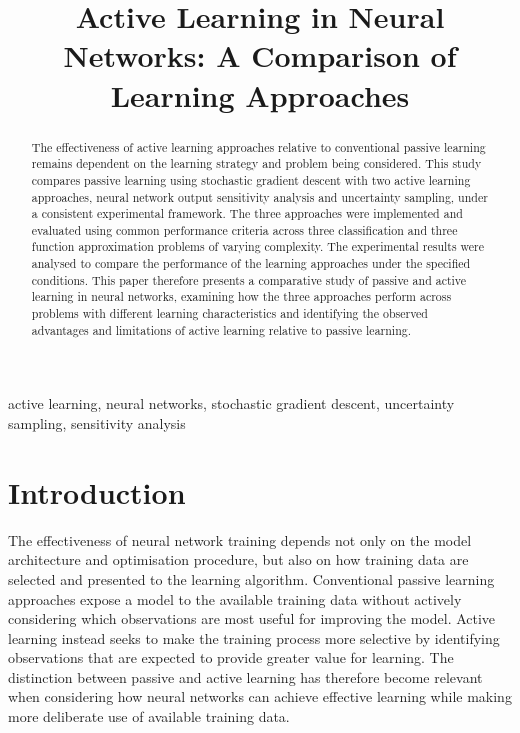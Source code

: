 \documentclass[conference]{IEEEtran}
\begin{document}
\title{Active Learning in Neural Networks: A Comparison of Learning Approaches}

\author{
}

\maketitle

\begin{abstract}
    The effectiveness of active learning approaches relative to conventional passive learning remains 
    dependent on the learning strategy and problem being considered. This study compares passive learning 
    using stochastic gradient descent with two active learning approaches, neural network output sensitivity analysis 
    and uncertainty sampling, under a consistent experimental framework. The three approaches were implemented and 
    evaluated using common performance criteria across three classification and three function approximation problems 
    of varying complexity. The experimental results were analysed to compare the performance of the learning approaches 
    under the specified conditions. This paper therefore presents a comparative study of passive and active learning 
    in neural networks, examining how the three approaches perform across problems with different learning characteristics 
    and identifying the observed advantages and limitations of active learning relative to passive learning.
\end{abstract}

\begin{IEEEkeywords}
active learning, neural networks, stochastic gradient descent,
uncertainty sampling, sensitivity analysis
\end{IEEEkeywords}


\section{Introduction}

The effectiveness of neural network training depends not only on the model architecture and optimisation procedure, 
but also on how training data are selected and presented to the learning algorithm. Conventional passive learning approaches 
expose a model to the available training data without actively considering which observations are most useful for improving the model. 
Active learning instead seeks to make the training process more selective by identifying observations that are expected to provide 
greater value for learning. The distinction between passive and active learning has therefore become relevant when considering 
how neural networks can achieve effective learning while making more deliberate use of available training data.
\end{document}

